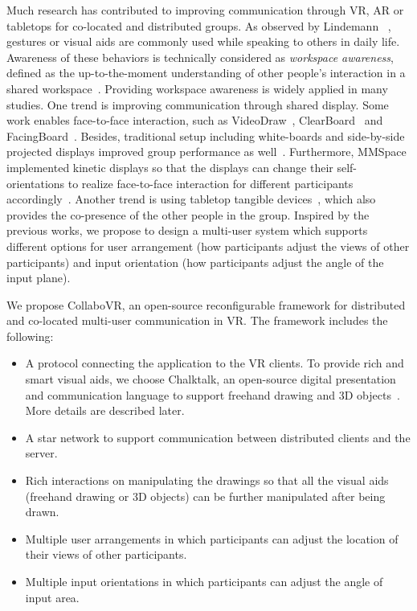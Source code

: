 \documentclass{sigchi}
\begin{document}
Much research has contributed to improving communication through VR, AR or tabletops for co-located and distributed groups. As observed by Lindemann ~\cite{tversky2003human}, gestures or visual aids are commonly used while speaking to others in daily life. Awareness of these behaviors is technically considered as \textit{workspace awareness}, defined as the up-to-the-moment understanding of other people's interaction in a shared workspace~\cite{li2014interactive}. Providing workspace awareness is widely applied in many studies. 
One trend is improving communication through shared display. Some work enables face-to-face interaction, such as VideoDraw~\cite{tang1990videodraw}, ClearBoard~\cite{ishii1993integration} and FacingBoard~\cite{li2014interactive}. Besides, traditional setup including white-boards and side-by-side projected displays improved group performance as well~\cite{plaue2009presence}. Furthermore, MMSpace implemented kinetic displays so that the displays can change their self-orientations to realize face-to-face interaction for different participants accordingly~\cite{otsuka2016mmspace}.
Another trend is using tabletop tangible devices~\cite{brave1998tangible, kunert2019multi}, which also provides the co-presence of the other people in the group. Inspired by the previous works, we propose to design a multi-user system which supports different options for user arrangement (how participants adjust the views of other participants) and input orientation (how participants adjust the angle of the input plane).

We propose CollaboVR, an open-source reconfigurable framework for distributed and co-located multi-user communication in VR. The framework includes the following:
\begin{itemize}
    \item A protocol connecting the application to the VR clients. To provide rich and smart visual aids, we choose Chalktalk, an open-source digital presentation and communication language to support freehand drawing and 3D objects~\cite{perlin2018chalktalk}. More details are described later.
    \item A star network to support communication between distributed clients and the server.
    \item Rich interactions on manipulating the drawings so that all the visual aids (freehand drawing or 3D objects) can be further manipulated after being drawn.
    \item Multiple user arrangements in which participants can adjust the location of their views of other participants.
    \item Multiple input orientations in which participants can adjust the angle of input area.
\end{itemize}
\end{document}
